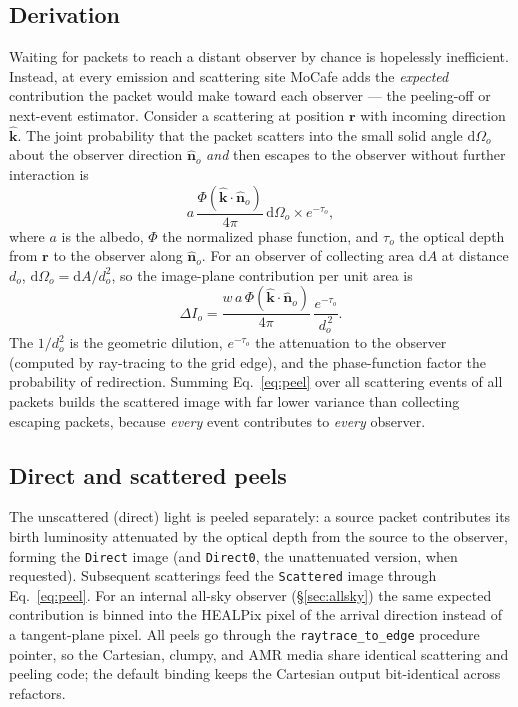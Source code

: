 \documentclass[english,a4paper]{kiseon_memo}
\newcommand{\khat}{\hat{\mathbf k}}
\newcommand{\nhat}{\hat{\mathbf n}}
\newcommand{\rvec}{\mathbf r}
\newcommand{\dd}{\mathrm{d}}
\newcommand{\code}[1]{\texttt{#1}}
\begin{document}
\subsection{Derivation}
Waiting for packets to reach a distant observer by chance is hopelessly
inefficient.  Instead, at every emission and scattering site MoCafe adds the
\emph{expected} contribution the packet would make toward each observer --- the
peeling-off or next-event estimator.  Consider a scattering at position $\rvec$
with incoming direction $\khat$.  The joint probability that the packet scatters
into the small solid angle $\dd\Omega_o$ about the observer direction $\nhat_o$
\emph{and} then escapes to the observer without further interaction is
\begin{equation}
  a\,\frac{\Phi(\khat\!\cdot\!\nhat_o)}{4\pi}\,\dd\Omega_o \times e^{-\tau_o},
\end{equation}
where $a$ is the albedo, $\Phi$ the normalized phase function, and $\tau_o$ the
optical depth from $\rvec$ to the observer along $\nhat_o$.  For an observer of
collecting area $\dd A$ at distance $d_o$, $\dd\Omega_o=\dd A/d_o^2$, so the
image-plane contribution per unit area is
\begin{equation}
  \Delta I_o = \frac{w\,a\,\Phi(\khat\!\cdot\!\nhat_o)}{4\pi}\,
               \frac{e^{-\tau_o}}{d_o^{\,2}}.
  \label{eq:peel}
\end{equation}
The $1/d_o^2$ is the geometric dilution, $e^{-\tau_o}$ the attenuation to the
observer (computed by ray-tracing to the grid edge), and the phase-function
factor the probability of redirection.  Summing Eq.~\eqref{eq:peel} over all
scattering events of all packets builds the scattered image with far lower
variance than collecting escaping packets, because \emph{every} event
contributes to \emph{every} observer.

\subsection{Direct and scattered peels}
The unscattered (direct) light is peeled separately: a source packet contributes
its birth luminosity attenuated by the optical depth from the source to the
observer, forming the \code{Direct} image (and \code{Direct0}, the unattenuated
version, when requested).  Subsequent scatterings feed the \code{Scattered}
image through Eq.~\eqref{eq:peel}.  For an internal all-sky observer
(\S\ref{sec:allsky}) the same expected contribution is binned into the HEALPix
pixel of the arrival direction instead of a tangent-plane pixel.  All peels go
through the \code{raytrace\_to\_edge} procedure pointer, so the Cartesian,
clumpy, and AMR media share identical scattering and peeling code; the default
binding keeps the Cartesian output bit-identical across refactors.
\end{document}
